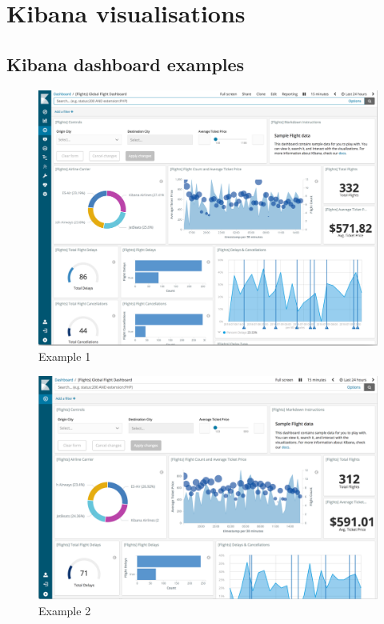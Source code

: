\documentclass[]{report}
\begin{document}
 

\appendix 
\chapter{Kibana visualisations}
\section{Kibana dashboard examples}
\begin{figure}[ht]
    \includegraphics[width =\columnwidth]{dashboard_example1.png}
    \caption{Example 1}
    \label{fig:EX1}
\end{figure}
\begin{figure}[ht]
    \includegraphics[width =\columnwidth]{dashboard_example2.png}
    \caption{Example 2}
    \label{fig:EX2}
\end{figure}
\end{document}
